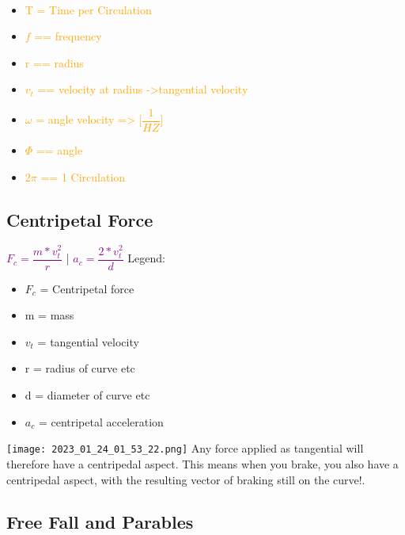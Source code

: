 \documentclass[main.tex,fontsize=8pt,paper=a4,paper=portrait,DIV=calc,]{scrartcl}
\begin{document}
\begin{multicols*}{2}
\, \newline \normalsize
\begin{itemize}
\item \textcolor{orange}{T = Time per Circulation}
\item \textcolor{orange}{\(f\) == frequency}
\item \textcolor{orange}{r == radius}
\item \textcolor{orange}{\(v_t\) == velocity at radius ->tangential velocity}
\item \textcolor{orange}{\(\omega\) = angle velocity => [\(\dfrac{1}{HZ}\)]}
\item \textcolor{orange}{\(\Phi\) == angle}
\item \textcolor{orange}{\(2\pi\) == 1 Circulation}
\end{itemize}

\subsection{Centripetal Force}
\large \textcolor{purple}{\( F_c = \dfrac{m * v_t^2}{r} \)} | 
\large \textcolor{purple}{\( a_c = \dfrac{2 * v_t^2}{d} \)}\newline
\normalsize Legend: 
\begin{itemize}
\item \(F_c\) = Centripetal force
\item m = mass
\item \(v_t\) = tangential velocity 
\item r = radius of curve etc
\item d = diameter of curve etc
\item \(a_c\) = centripetal acceleration
\end{itemize}
\texttt{[image: 2023\_01\_24\_01\_53\_22.png]}\newline
Any force applied as tangential will therefore have a centripedal aspect.\newline
This means when you brake, you also have a centripedal aspect, with the resulting vector of braking still on the curve!.

\subsection{Free Fall and Parables}

\end{multicols*}
\end{document}
